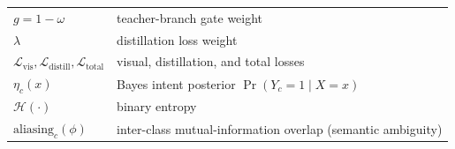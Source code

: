\begin{table}[H]
{\begin{tabular}{ll}
$g=1-\omega$ & teacher-branch gate weight \\
$\lambda$ & distillation loss weight \\
$\mathcal{L}_{\text{vis}},\mathcal{L}_{\text{distill}},\mathcal{L}_{\text{total}}$ & visual, distillation, and total losses \\
$\eta_c(x)$ & Bayes intent posterior $\Pr(Y_c{=}1\mid X{=}x)$ \\
$\mathcal{H}(\cdot)$ & binary entropy \\
$\text{aliasing}_c(\phi)$ & inter-class mutual-information overlap (semantic ambiguity) \\
\hline
\end{tabular}
}
\end{table}
\fi
